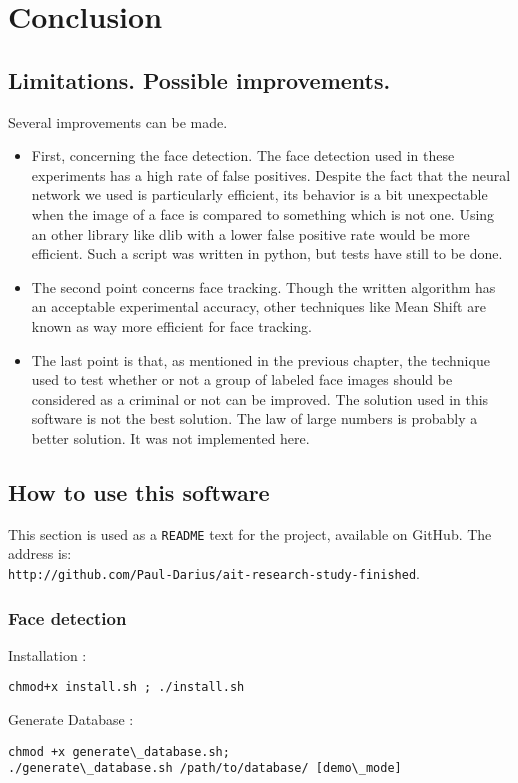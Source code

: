\setlength{\footskip}{8mm}

\chapter{Conclusion}
\label{ch:conclusion}


\section{Limitations. Possible improvements.}
Several improvements can be made.
\begin{itemize}
\item First, concerning the face detection. The face detection used in these experiments has a high rate of false positives. Despite the fact that the neural network we used is particularly efficient, its behavior is a bit unexpectable when the image of a face is compared to something which is not one. Using an other library like dlib with a lower false positive rate would be more efficient. Such a script was written in python, but tests have still to be done.
\item The second point concerns face tracking. Though the written algorithm has an acceptable experimental accuracy, other techniques like Mean Shift are known as way more efficient for face tracking.
\item The last point is that, as mentioned in the previous chapter, the technique used to test whether or not a group of labeled face images should be considered as a criminal or not can be improved. The solution used in this software is not the best solution. The law of large numbers is probably a better solution. It was not implemented here.
\end{itemize}

\section{How to use this software}
This section is used as a \texttt{README} text for the project, available on GitHub. The address is:\\ \texttt{http://github.com/Paul-Darius/ait-research-study-finished}.\newpage
\FloatBarrier

\subsection{Face detection}

Installation : 
\begin{verbatim}
chmod+x install.sh ; ./install.sh
\end{verbatim}
Generate Database : 
\begin{verbatim}
chmod +x generate\_database.sh;
./generate\_database.sh /path/to/database/ [demo\_mode]
\end{verbatim}

